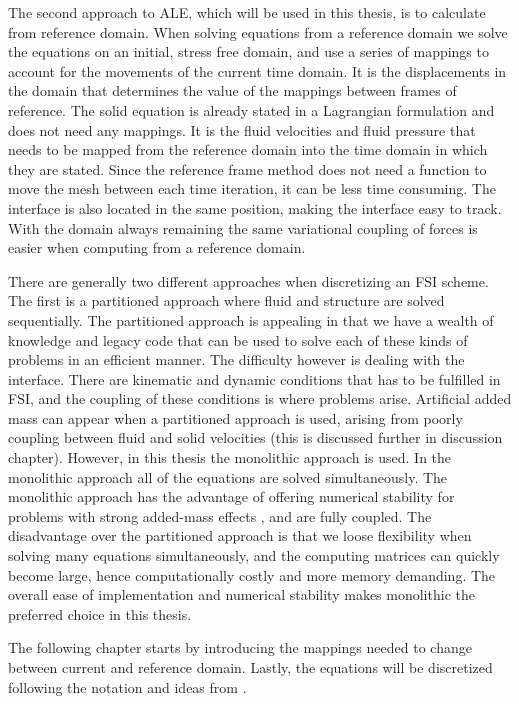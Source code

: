 The second approach to ALE, which will be used in this thesis, is to calculate from reference domain.
When solving equations from a reference domain we solve the equations on an initial, stress free domain, and use a series of mappings to account for the movements of the current time domain. It is the displacements in the domain that determines the value of the mappings between frames of reference. The solid equation is already stated in a Lagrangian formulation and does not need any mappings. It is the fluid velocities and fluid pressure that needs to be mapped from the reference domain into the time domain in which they are stated.
Since the reference frame method does not need a function to move the mesh between each time iteration, it can be less time consuming. The interface is also located in the same position, making the interface easy to track. With the domain always remaining the same variational coupling of forces is easier when computing from a reference domain.\newline

There are generally two different approaches when discretizing an FSI scheme. The first is a partitioned approach where fluid and structure are solved sequentially. The partitioned approach is appealing in that we have a wealth of knowledge and legacy code that can be used to solve each of these kinds of problems in an efficient manner. The difficulty however is dealing with the interface. There are kinematic and dynamic conditions that has to be fulfilled in FSI, and the coupling of these conditions is where problems arise. Artificial added mass can appear when a partitioned approach is used, arising from poorly coupling between fluid and solid velocities (this is discussed further in discussion chapter). However, in this thesis the monolithic approach is used. In the monolithic approach all of the equations are solved simultaneously. The monolithic approach has the advantage of offering numerical stability for problems with strong added-mass effects \cite{Liu2014}, and are fully coupled. The disadvantage over the partitioned approach is that we loose flexibility when solving many equations simultaneously, and the computing matrices can quickly become large, hence computationally costly and more memory demanding. The overall ease of implementation and numerical stability makes monolithic the preferred choice in this thesis. \newline

The following chapter starts by introducing the mappings needed to change between current and reference domain. Lastly, the equations will be discretized following the notation and ideas from \cite{Richter2010}.

